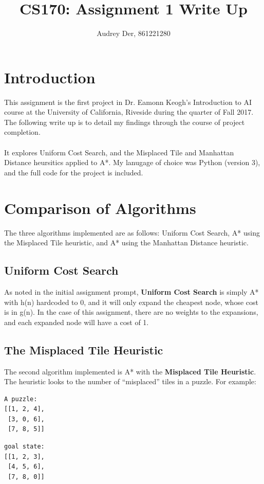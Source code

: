 \documentclass[a4paper]{article}
\title{CS170: Assignment 1 Write Up}
\author{Audrey Der, 861221280}
\begin{document}
\maketitle


\section{Introduction}

This assignment is the first project in Dr. Eamonn Keogh's Introduction to AI
course at the University of California, Riveside during the quarter of Fall
2017. The following write up is to detail my findings through the course of
project completion. \\ \\ It explores Uniform Cost Search, and the Misplaced Tile and
Manhattan Distance heursitics applied to A*. My lanugage of choice was Python
(version 3), and the full code for the project is included.

\section{Comparison of Algorithms}
The three algorithms implemented are as follows: Uniform Cost Search, A* using
the Misplaced Tile heuristic, and A* using the Manhattan Distance heuristic.

\subsection{Uniform Cost Search}
As noted in the initial assignment prompt, \textbf{Uniform Cost Search} is simply A* with
h(n) hardcoded to 0, and it will only expand the cheapest node, whose cost is in
g(n). In the case of this assignment, there are no weights to the expansions,
and each expanded node will have a cost of 1.

\subsection{The Misplaced Tile Heuristic}
The second algorithm implemented is A* with the \textbf{Misplaced Tile Heuristic}. The
heuristic looks to the number of ``misplaced'' tiles in a puzzle. For example:

\begin{multicols}{2}
\begin{verbatim}
A puzzle:
[[1, 2, 4],
 [3, 0, 6],
 [7, 8, 5]]
\end{verbatim}
\begin{verbatim}
goal state:
[[1, 2, 3],
 [4, 5, 6],
 [7, 8, 0]]
\end{verbatim}
  \end{multicols}
\end{document}
